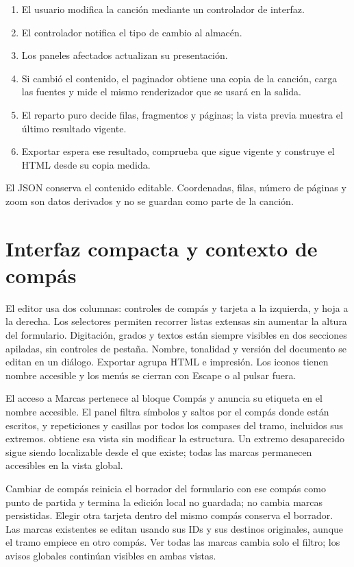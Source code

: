 \documentclass[a4paper,11pt]{article}
\let\originaltexttt\texttt
\renewcommand{\texttt}[1]{\originaltexttt{\seqsplit{#1}}}
\providecommand{\tightlist}{\setlength{\itemsep}{2pt}\setlength{\parskip}{0pt}}
\begin{document}
\begin{enumerate}
\def\labelenumi{\arabic{enumi}.}
\tightlist
\item
  El usuario modifica la canción mediante un controlador de interfaz.
\item
  El controlador notifica el tipo de cambio al almacén.
\item
  Los paneles afectados actualizan su presentación.
\item
  Si cambió el contenido, el paginador obtiene una copia de la canción,
  carga las fuentes y mide el mismo renderizador que se usará en la
  salida.
\item
  El reparto puro decide filas, fragmentos y páginas; la vista previa
  muestra el último resultado vigente.
\item
  Exportar espera ese resultado, comprueba que sigue vigente y construye
  el HTML desde su copia medida.
\end{enumerate}

El JSON conserva el contenido editable. Coordenadas, filas, número de
páginas y zoom son datos derivados y no se guardan como parte de la
canción.

\Needspace{3.5cm}
\section{Interfaz compacta y contexto de
compás}\label{interfaz-compacta-y-contexto-de-compuxe1s}

El editor usa dos columnas: controles de compás y tarjeta a la
izquierda, y hoja a la derecha. Los selectores permiten recorrer listas
extensas sin aumentar la altura del formulario. Digitación, grados y
textos están siempre visibles en dos secciones apiladas, sin controles
de pestaña. Nombre, tonalidad y versión del documento se editan en un
diálogo. Exportar agrupa HTML e impresión. Los iconos tienen nombre
accesible y los menús se cierran con Escape o al pulsar fuera.

El acceso a Marcas pertenece al bloque Compás y anuncia su etiqueta en
el nombre accesible. El panel filtra símbolos y saltos por el compás
donde están escritos, y repeticiones y casillas por todos los compases
del tramo, incluidos sus extremos. \texttt{src/model/marksContext.js}
obtiene esa vista sin modificar la estructura. Un extremo desaparecido
sigue siendo localizable desde el que existe; todas las marcas
permanecen accesibles en la vista global.

Cambiar de compás reinicia el borrador del formulario con ese compás
como punto de partida y termina la edición local no guardada; no cambia
marcas persistidas. Elegir otra tarjeta dentro del mismo compás conserva
el borrador. Las marcas existentes se editan usando sus IDs y sus
destinos originales, aunque el tramo empiece en otro compás. Ver todas
las marcas cambia solo el filtro; los avisos globales continúan visibles
en ambas vistas.
\end{document}

